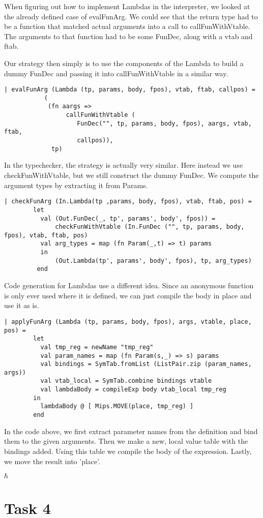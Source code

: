 \documentclass[10pt]{article}
\begin{document}
When figuring out how to implement Lambdas in the interpreter, we looked at the already defined case of evalFunArg. We could see that the return type had to be a function that matched actual arguments into a call to callFunWithVtable. The arguments to that function had to be some FunDec, along with a vtab and ftab.

Our strategy then simply is to use the components of the Lambda to build a dummy FunDec and passing it into callFunWithVtable in a similar way.

\begin{Verbatim}[frame=single]
    | evalFunArg (Lambda (tp, params, body, fpos), vtab, ftab, callpos) =
           (
            (fn aargs =>
                 callFunWithVtable (
                    FunDec("", tp, params, body, fpos), aargs, vtab, ftab,
                    callpos)),
             tp)
\end{Verbatim}

In the typechecker, the strategy is actually very similar. Here instead we use checkFunWithVtable, but we still construct the dummy FunDec. We compute the argument types by extracting it from Params.

\begin{Verbatim}[frame=single]
    | checkFunArg (In.Lambda(tp ,params, body, fpos), vtab, ftab, pos) =
        let 
          val (Out.FunDec(_, tp', params', body', fpos)) = 
              checkFunWithVtable (In.FunDec ("", tp, params, body, fpos), vtab, ftab, pos)
          val arg_types = map (fn Param(_,t) => t) params
          in
              (Out.Lambda(tp', params', body', fpos), tp, arg_types)
         end
\end{Verbatim}

Code generation for Lambdas use a different idea. Since an anonymous function is only ever used where it is defined, we can just compile the body in place and use it as is.

\begin{Verbatim}[frame=single]
      | applyFunArg (Lambda (tp, params, body, fpos), args, vtable, place, pos) =
        let  
          val tmp_reg = newName "tmp_reg"
          val param_names = map (fn Param(s,_) => s) params
          val bindings = SymTab.fromList (ListPair.zip (param_names, args))
          val vtab_local = SymTab.combine bindings vtable
          val lambdaBody = compileExp body vtab_local tmp_reg
        in   
          lambdaBody @ [ Mips.MOVE(place, tmp_reg) ]
        end
\end{Verbatim}

In the code above, we first extract parameter names from the definition and bind them to the given arguments. Then we make a new, local value table with the bindings added. Using this table we compile the body of the expression. Lastly, we move the result into 'place'.

$\hbar$

\section{Task 4}

\begin{Verbatim}[frame=single]

\end{Verbatim}
\end{document}
